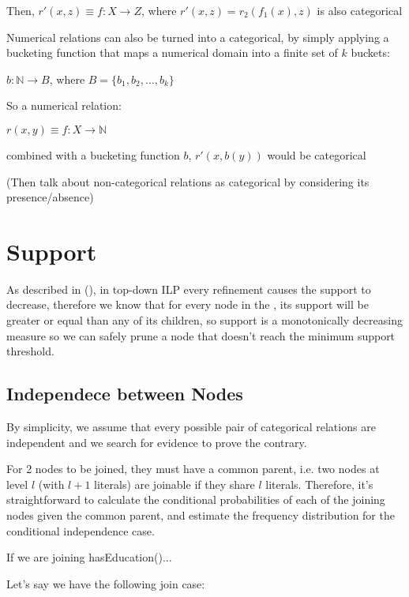 Then, $r'(x,z) \equiv f : X \rightarrow Z$, where $r'(x,z)=r_2(f_1(x),z)$ is also categorical


Numerical relations can also be turned into a categorical, by simply applying a bucketing function that maps a numerical domain into a finite set of $k$ buckets:

$b: \mathbb{N} \rightarrow B$, where $B=\{b_1,b_2,\dots ,b_k \}$

So a numerical relation:

$r(x,y) \equiv f : X \rightarrow \mathbb{N}$ 

combined with a bucketing function $b$, $r'(x,b(y))$ would be categorical

(Then talk about non-categorical relations as categorical by considering its presence/absence)

\section{Support}

As described in (\cite{LavracDz94}), in top-down ILP every refinement causes the support to decrease, therefore we know that for every node in the \graphname, its support will be greater or equal than any of its children, so support is a monotonically decreasing measure so we can safely prune a node that doesn't reach the minimum support threshold.


\subsection{Independece between Nodes}

By simplicity, we assume that every possible pair of categorical relations are independent and we search for evidence to prove the contrary.

For 2 nodes to be joined, they must have a common parent, i.e. two nodes at level $l$ (with $l+1$ literals) are joinable if they share $l$ literals. Therefore, it's straightforward to calculate the conditional probabilities of each of the joining nodes given the common parent, and estimate the frequency distribution for the conditional independence case.

If we are joining hasEducation()...

Let's say we have the following join case:

